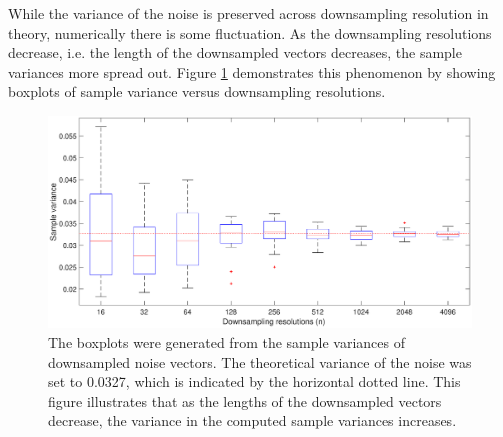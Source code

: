 \documentclass[12pt,notitlepage]{report}
\DeclareMathOperator{\alias}{A}	%
\newtheorem{theorem}{Theorem}[section]
\begin{document}
%

While the variance of the noise is preserved across downsampling resolution in theory, numerically there is some fluctuation. As the downsampling resolutions decrease, i.e. the length of the downsampled vectors decreases, the sample variances more spread out. Figure \ref{VarPlot1D} demonstrates this phenomenon by showing boxplots of sample variance versus downsampling resolutions. %

\begin{figure}[htb]
\centerline{\includegraphics[scale=0.45]{Figures/VarPlot1D_F1_S05_W100_R20.eps}}
\caption{The boxplots were generated from the sample variances of downsampled noise vectors. The theoretical variance of the noise was set to 0.0327, which is indicated by the horizontal dotted line. This figure illustrates that as the lengths of the downsampled vectors decrease, the variance in the computed sample variances increases.}
\label{VarPlot1D}
\end{figure}
\end{document}
